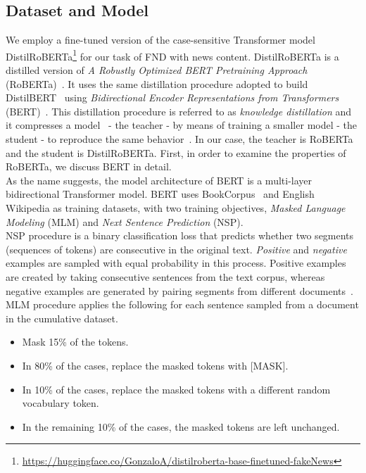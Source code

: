 \subsection{Dataset and Model}
\label{subsec:newContentModel_DatasetAndModel}
We employ a fine-tuned version of the case-sensitive Transformer model DistilRoBERTa\footnote{\url{https://huggingface.co/GonzaloA/distilroberta-base-finetuned-fakeNews}} for our task of FND with news content. DistilRoBERTa is a distilled version of \emph{A Robustly Optimized BERT Pretraining Approach} (RoBERTa)~\parencite{RoBERTa_Liu}. It uses the same distillation procedure adopted to build  DistilBERT~\parencite{DistilBERT_Sanh} using \emph{Bidirectional Encoder Representations from Transformers} (BERT)~\parencite{BERT_Devlin}. This distillation procedure is referred to as \emph{knowledge distillation} and it compresses a model~\parencite{ModelCompression_Bucilua} - the teacher - by means of training a smaller model - the student - to reproduce the same behavior~\parencite{DistillingTheKnowledge_Hinton}. In our case, the teacher is  RoBERTa and the student is DistilRoBERTa. First, in order to examine the properties of RoBERTa, we discuss BERT in detail.\\
As the name suggests, the model architecture of BERT is a multi-layer bidirectional Transformer model. BERT uses BookCorpus~\parencite{BookCorpus_Yukun} and English Wikipedia as training datasets, with two training objectives, \emph{Masked Language Modeling} (MLM) and \emph{Next Sentence Prediction} (NSP).\\
NSP procedure is a binary classification loss that predicts whether two segments (sequences of tokens) are consecutive in
the original text. \emph{Positive} and \emph{negative} examples are sampled with equal probability in this process.
Positive examples are created by taking consecutive sentences from the text corpus, whereas negative examples
are generated by pairing segments from different documents~\parencite{BERT_Devlin,RoBERTa_Liu}.\\
MLM procedure applies the following for each sentence sampled from a document in the cumulative dataset.
\begin{itemize}
    \item Mask 15\% of the tokens.
    \item In 80\% of the cases, replace the masked tokens with [MASK].
    \item In 10\% of the cases, replace the masked tokens with a different random vocabulary token.
    \item In the remaining 10\% of the cases, the masked tokens are left unchanged.
\end{itemize}
